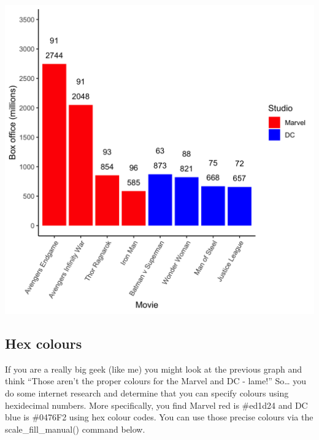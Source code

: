\documentclass[
]{krantz}
\begin{document}
\includegraphics[width=0.85\linewidth]{ch_graphing/images/base_color_graph}

\hypertarget{hex-colours}{%
\subsection{Hex colours}\label{hex-colours}}

If you are a really big geek (like me) you might look at the previous graph and think ``Those aren't the proper colours for the Marvel and DC - lame!'' So\ldots{} you do some internet research and determine that you can specify colours using hexidecimal numbers. More specifically, you find Marvel red is \#ed1d24 and DC blue is \#0476F2 using hex colour codes. You can use those precise colours via the scale\_fill\_manual() command below.
\end{document}
